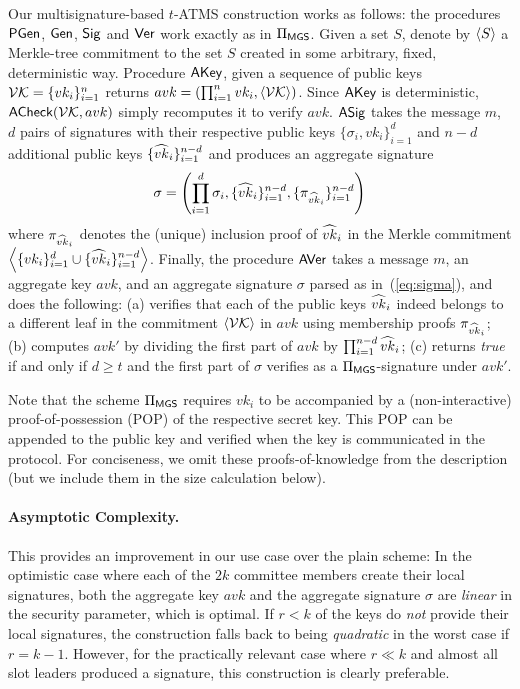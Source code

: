 Our multisignature-based $t$-ATMS construction works as follows: the procedures $\textsf{PGen}$,
$\mathsf{Gen}$, $\mathsf{Sig}$ and $\mathsf{Ver}$ work exactly as in $\Pi_{\textsf{MGS}}$.
Given a  set $S$, denote by $\left\langle S \right\rangle$ a Merkle-tree commitment to the set $S$ created
 in some arbitrary, fixed, deterministic way.
%
Procedure $\textsf{AKey}$, given a sequence
of public keys $\mathcal{VK}=\{vk_i\}_{i=1}^{n}$ returns
$avk=(\prod_{i=1}^{n}vk_i,\left\langle \mathcal{VK} \right\rangle)$.
%
Since $\textsf{AKey}$ is deterministic, $\textsf{ACheck}(\mathcal{VK},avk)$ simply recomputes it
to verify $avk$.
%
$\textsf{ASig}$ takes the message $m$, $d$ pairs of signatures with their respective public keys
$\{\sigma_i,vk_i\}_{i=1}^{d}$ and $n-d$ additional public keys
$\{\widehat{vk}_i\}_{i=1}^{n-d}$ and produces an aggregate signature
\begin{equation}
  \label{eq:sigma}
\sigma =
\left(
  \prod_{i=1}^{d}\sigma_i,
  \{\widehat{vk}_i\}_{i=1}^{n-d},
  \{\pi_{\widehat{vk}_i}\}_{i=1}^{n-d}
\right)
\end{equation}
where $\pi_{\widehat{vk}_i}$ denotes the (unique) inclusion proof of $\widehat{vk}_i$ in the
Merkle commitment $\left\langle \{vk_i\}_{i=1}^{d}\cup\{\widehat{vk}_i\}_{i=1}^{n-d} \right\rangle$.
%
Finally, the procedure $\textsf{AVer}$ takes
a message $m$,
an aggregate key $avk$,
and an aggregate signature $\sigma$ parsed as in~(\ref{eq:sigma}),
and does the following:
(a) verifies that each of the public keys $\widehat{vk}_i$ indeed belongs to a different
leaf in the commitment $\left\langle \mathcal{VK} \right\rangle$ in $avk$ using membership proofs
$\pi_{\widehat{vk}_i}$;
(b) computes $avk'$ by dividing the first part of $avk$ by
$\prod_{i=1}^{n-d}\widehat{vk}_i$;
(c) returns \emph{true} if and only if $d\geq t$ and the first part of $\sigma$
verifies as a $\Pi_{\textsf{MGS}}$-signature under $avk'$.

Note that  the scheme $\Pi_{\textsf{MGS}}$ requires $vk_i$ to be  accompanied by a (non-interactive)
proof-of-possession (POP) \cite{RY} of the respective secret key.  This POP can be
appended to the public key and verified when the key is communicated in the
protocol.  For conciseness, we omit these proofs-of-knowledge from the
description (but we include them in the size calculation below).

\paragraph{Asymptotic Complexity.}
This provides an improvement in our use case over the plain scheme:
In the optimistic case where each of the
$2k$ committee members create their local signatures,
both the aggregate key $avk$ and the aggregate signature $\sigma$ are
\emph{linear} in the security parameter, which is optimal.
If %
$r<k$ of the keys do \emph{not} provide their local signatures,  the construction falls back
to being \emph{quadratic} in the worst case if $r = k - 1$.
However, for the
practically relevant case where
$r \ll k$ and almost all slot leaders produced a signature, this construction is
clearly preferable.

